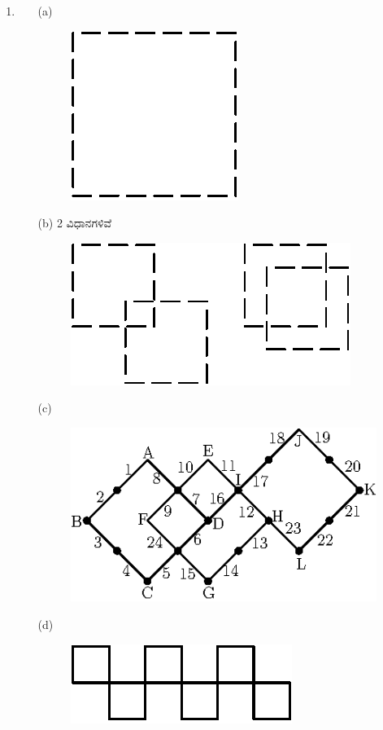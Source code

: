 \begin{enumerate}
\item
\begin{itemize}
\item[(a)] 
\begin{figure}[H]
\centering
\includegraphics{images/chap6/ans9a.eps}
\end{figure}
\item[(b)] 2 ವಿಧಾನಗಳಿವೆ 
\begin{figure}[H]
\centering
\includegraphics{images/chap6/ans9b.eps}
\end{figure}
\item[(c)]
\begin{figure}[H]
\centering
\includegraphics{images/chap6/ans9c.eps}
\end{figure}
\item[(d)]
\begin{figure}[H]
\centering
\includegraphics{images/chap6/ans9d.eps}

\end{figure}
\end{itemize}
\end{enumerate}
